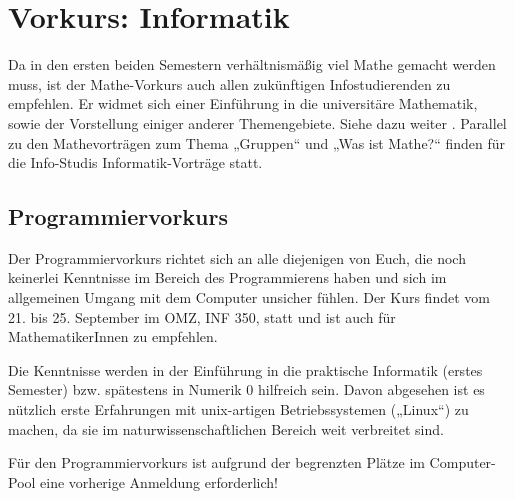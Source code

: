 \section{Vorkurs: Informatik}
\label{vkinfo}
Da in den ersten beiden Semestern verhältnismäßig viel Mathe gemacht werden muss, ist der Mathe-Vorkurs auch allen zukünftigen Infostudierenden zu empfehlen. Er widmet sich einer Einführung in die universitäre Mathematik, sowie der Vorstellung einiger anderer Themengebiete. Siehe dazu weiter
.
Parallel zu den Mathevorträgen zum Thema „Gruppen“ und „Was ist Mathe?“ finden für die Info-Studis Informatik-Vorträge statt.

\parskip

\subsection{Programmiervorkurs}
Der Programmiervorkurs richtet sich an alle diejenigen von Euch, die noch keinerlei Kenntnisse im Bereich des Programmierens haben und sich im allgemeinen Umgang mit dem Computer unsicher fühlen. Der Kurs findet vom 21. bis 25. September im OMZ, \gls{INF} 350, statt und ist auch für MathematikerInnen zu empfehlen.

Die Kenntnisse werden in der Einführung in die praktische Informatik (erstes
Semester) bzw. spätestens in Numerik 0 hilfreich sein. Davon abgesehen ist es
nützlich erste Erfahrungen mit unix-artigen Betriebssystemen („Linux“) zu
machen, da sie im naturwissenschaftlichen Bereich weit verbreitet sind.

Für den Programmiervorkurs ist aufgrund der begrenzten Plätze im Computer-Pool
eine vorherige Anmeldung erforderlich!

